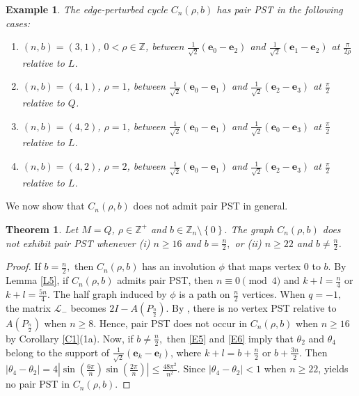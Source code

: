 \documentclass[12pt,a4paper]{article}
\newtheorem{thm}{Theorem}
\newtheorem{exm}{Example}
\def \e {{\mathbf e}}
\newcommand{\ob}[1]{\left(#1\right)}
\newcommand{\cb}[1]{\left\lbrace #1\right\rbrace}
\begin{document}
\begin{exm}
The edge-perturbed cycle $C_n (\rho, b)$ has pair PST in the following cases:
	\begin{enumerate}
		\item $(n,b)=(3,1)$, $0<\rho\in\mathbb{Z}$, between $\frac{1}{\sqrt{2}}(\e_0-\e_2)$ and $\frac{1}{\sqrt{2}}(\e_1-\e_2)$ at $\frac{\pi}{2\rho}$ relative to $L$. 
		\item $(n,b)=(4,1)$, $\rho=1$, between $\frac{1}{\sqrt{2}}(\e_0-\e_1)$ and $\frac{1}{\sqrt{2}}(\e_2-\e_3)$ at $\frac{\pi}{2}$ relative to $Q$. 
		\item $(n,b)=(4,2)$, $\rho=1$, between $\frac{1}{\sqrt{2}}(\e_0-\e_1)$ and $\frac{1}{\sqrt{2}}(\e_0-\e_3)$ at $\frac{\pi}{2}$ relative to $L$.
		\item $(n,b)=(4,2)$, $\rho=2$, between $\frac{1}{\sqrt{2}}(\e_0-\e_1)$ and $\frac{1}{\sqrt{2}}(\e_2-\e_3)$ at $\frac{\pi}{2}$ relative to $L$.
	\end{enumerate}

\end{exm}
We now show that $C_n (\rho, b)$ does not admit pair PST in general. 

\begin{thm}
\label{Q}
Let $M=Q$, $\rho \in \mathbb{Z}^+$ and $b \in \mathbb{Z}_n\setminus \cb{0}.$ The graph $C_n (\rho, b)$ does not exhibit pair PST whenever (i) $n \geq 16$ and $b=\frac{n}{2},$ or (ii) $n \geq 22$ and $b\neq\frac{n}{2}$.
\end{thm}

\begin{proof}
If $b=\frac{n}{2},$ then $C_n (\rho, b)$ has an involution $\phi$ that maps vertex $0$ to $b$. By Lemma \ref{L5}, if $C_n (\rho, b)$ admits pair PST, then $n \equiv 0 \pmod{4}$ and $k + l = \frac{n}{4}$  or $ k + l = \frac{5n}{4}$. The half graph induced by $\phi$ is a path on $\frac{n}{2}$ vertices. When $q=-1,$ the matrix $\mathscr{L}_-$ becomes $2I-A(P_{\frac{n}{2}})$. By \cite[Theorem 9]{cou2024}, there is no vertex PST relative to $A(P_{\frac{n}{2}})$ when $n\geq 8$. Hence, pair PST does not occur in $C_n (\rho, b)$ when $n \geq 16$ by Corollary \ref{C1}(1a). Now, if $b \neq \frac{n}{2},$ then \eqref{E5} and \eqref{E6} imply that $\theta_2$ and $\theta_4$ belong to the support of $\frac{1}{\sqrt{2}}(\e_k-\e_l)$, where $k+l =b+\frac{n}{2}$ or $b+\frac{3n}{2}.$ Then $|\theta_4-\theta_2| = 4\left|\sin\ob{\frac{6\pi}{n}} \sin\ob{\frac{2\pi}{n}} \right|
	\leq \frac{48\pi^2}{n^2}.$ Since $|\theta_4-\theta_2| <1$ when $n \geq 22$, \cite[Corollary 3.4]{kim} yields no pair PST in $C_n (\rho, b)$.
\end{proof}
\end{document}
